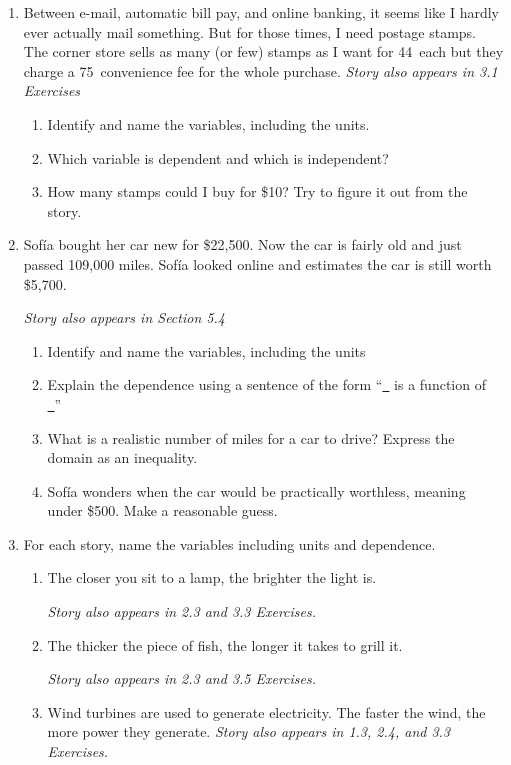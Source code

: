 \begin{enumerate}
\item Between e-mail, automatic bill pay, and online banking, it seems like I hardly ever actually mail something.   But for those times, I need postage stamps. The corner store sells as many (or few) stamps as I want for 44\textcent~each but they charge a 75\textcent~convenience fee for the whole purchase.   \hfill \emph{Story also appears in 3.1 Exercises}
\begin{enumerate}
\item  Identify and name the variables, including the units.
\item Which variable is dependent and which is independent?
\item How many stamps could I buy for \$10?  Try to figure it out from the story.\end{enumerate} 

\item Sof\'ia bought her car new for \$22,500.  Now the car is fairly old and just passed 109,000 miles.  Sof\'ia looked online and estimates the car is still worth \$5,700.   

  \hfill \emph{Story also appears in Section 5.4} 
\begin{enumerate}
\item Identify and name the variables, including the units
\item Explain the dependence using a sentence of the form ``\underline{~\quad} is a function of \underline{~\quad}''
\item What is a realistic number of miles for a car to drive?  Express the domain as an inequality.
\item Sof\'ia  wonders when the car would be practically worthless, meaning under \$500.   Make a reasonable guess.
\end{enumerate} 

\item For each story, name the variables including units and dependence.
\begin{enumerate}
\item The closer you sit to a lamp, the brighter the light is. 

\hfill \emph{Story also appears in 2.3 and 3.3 Exercises.}
\item The thicker the piece of fish, the longer it takes to grill it.

\hfill \emph{Story also appears in 2.3 and 3.5 Exercises.}
\item Wind turbines are used to generate electricity.  The faster the wind, the more power they generate. \hfill \emph{Story also appears in 1.3, 2.4, and 3.3 Exercises.}

\end{enumerate}

\end{enumerate}



